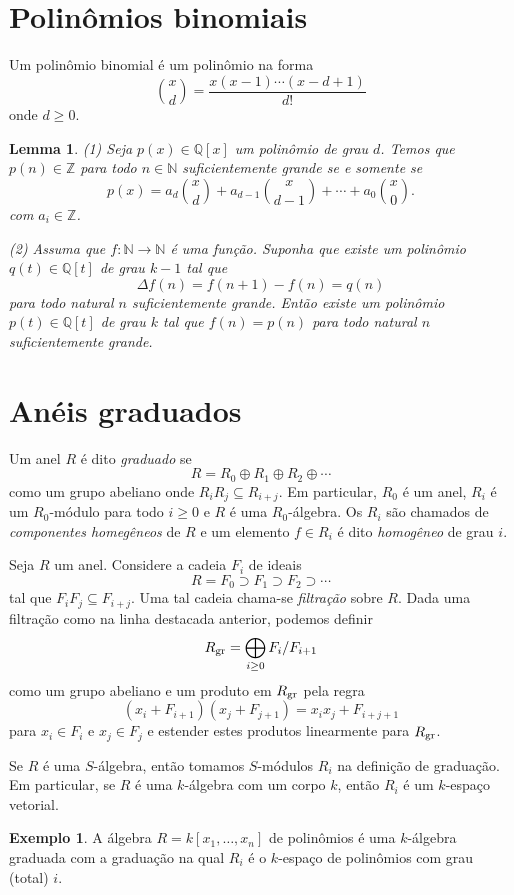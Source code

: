 \documentclass[12pt]{amsart}
\newcommand{\Z}{\mathbb Z}
\newtheorem{lemma}[theorem]{Lemma}
\theoremstyle{definition}
\newtheorem{example}[theorem]{Exemplo}
\begin{document}
\section{Polinômios binomiais}

Um polinômio binomial é um polinômio na forma 
$$
    \binom xd=\frac{x(x-1)\cdots(x-d+1)}{d!}
$$
onde $d\geq 0$. %

\begin{lemma}
    (1) Seja $p(x)\in\mathbb Q[x]$ um polinômio de grau $d$. Temos que $p(n)\in\mathbb Z$ para todo $n\in\mathbb N$ 
suficientemente grande se e somente se 
$$
    p(x)=a_d \binom{x}{d}+a_{d-1}\binom{x}{d-1}+\cdots+a_0\binom{x}{0}.
$$
com $a_i\in\Z$. 

(2) Assuma que $f:\mathbb N\to\mathbb N$ é uma função. Suponha que existe um polinômio $q(t)\in\mathbb Q[t]$ de 
grau $k-1$ tal que 
$$
\Delta f(n)=f(n+1)-f(n)=q(n)
$$
para todo natural $n$ suficientemente grande. Então existe um polinômio $p(t)\in\mathbb Q[t]$ 
de grau $k$ tal que $f(n)=p(n)$ para todo natural $n$ suficientemente grande. 
\end{lemma}

\section{Anéis graduados}

Um anel $R$ é dito \emph{graduado} se 
$$
R=R_0\oplus R_1\oplus R_2\oplus \cdots
$$
como um grupo abeliano onde $R_iR_j\subseteq R_{i+j}$. Em particular, $R_0$ é um anel, $R_i$ é um $R_0$-módulo 
para todo $i\geq 0$ e $R$ é uma $R_0$-álgebra. Os $R_i$ são chamados de \emph{componentes homegêneos} de $R$ e um 
elemento $f\in R_i$ é dito \emph{homogêneo} de grau $i$. 

Seja $R$ um anel. Considere a cadeia $F_i$ de ideais 
\[
R = F_0\supset F_1\supset F_2\supset\cdots 
\]
tal que $F_iF_j\subseteq F_{i+j}$. Uma tal cadeia chama-se {\em filtração} sobre $R$. Dada uma filtração 
como na linha destacada anterior, podemos definir
\[
    R_{\rm gr}=\bigoplus_{i\geq 0}F_{i}/F_{i+1}
\]
como um grupo abeliano e um produto em $R_{\rm gr}$ pela regra
\[
    (x_i+F_{i+1})(x_j+F_{j+1})=x_ix_j+F_{i+j+1}
\]
para $x_i\in F_i$ e $x_j\in F_{j}$ e estender estes produtos linearmente para $R_{\rm gr}$.

Se $R$ é uma $S$-álgebra, então tomamos $S$-módulos $R_i$ na definição de graduação. Em particular, 
se $R$ é uma $k$-álgebra com um corpo $k$, então $R_i$ é um $k$-espaço vetorial.
\begin{example} 
    A álgebra $R=k[x_1,\ldots,x_n]$ de polinômios é uma $k$-álgebra graduada com a graduação na qual $R_i$ é 
o $k$-espaço de polinômios com grau (total) $i$. 
\end{example}
\end{document}

